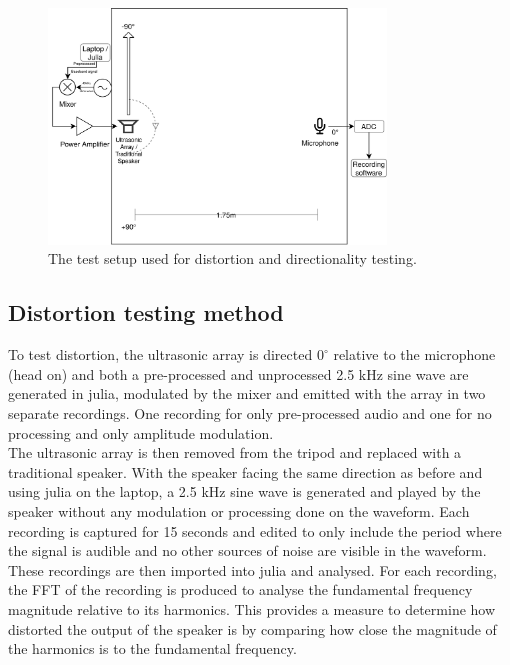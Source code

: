 \begin{figure}[ht!]
    \centering
    \includegraphics[width=0.8\textwidth]{Figures/Testing/Test_setup.png}
    \caption{The test setup used for distortion and directionality testing.}
    \label{fig:testsetup}
\end{figure}
\newpage
\subsection{Distortion testing method}
To test distortion, the ultrasonic array is directed  $0^\circ$ relative to the microphone (head on) and both a pre-processed and unprocessed 2.5 kHz sine wave are generated in julia, modulated by the mixer and emitted with the array in two separate recordings. One recording for only pre-processed audio and one for no processing and only amplitude modulation.\\
The ultrasonic array is then removed from the tripod and replaced with a traditional speaker. With the speaker facing the same direction as before and using julia on the laptop, a 2.5 kHz sine wave is generated and played by the speaker without any modulation or processing done on the waveform.
Each recording is captured for 15 seconds and edited to only include the period where the signal is audible and no other sources of noise are visible in the waveform.\\
These recordings are then imported into julia and analysed. For each recording, the FFT of the recording is produced to analyse the fundamental frequency magnitude relative to its harmonics. This provides a measure to determine how distorted the output of the speaker is by comparing how close the magnitude of the harmonics is to the fundamental frequency.

